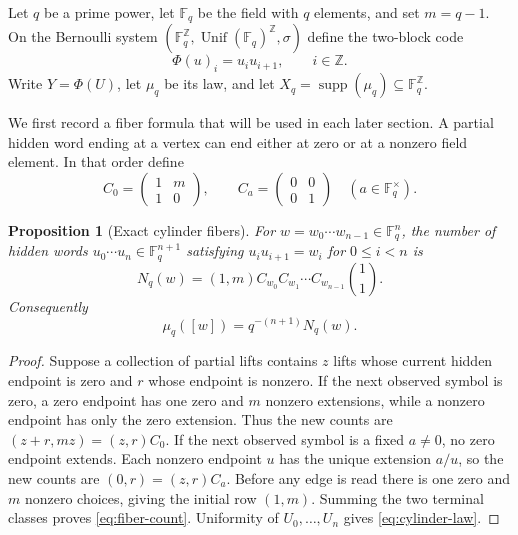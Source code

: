 \documentclass[11pt,a4paper]{amsart}
\newtheorem{proposition}[theorem]{Proposition}
\theoremstyle{definition}
\theoremstyle{remark}
\newcommand{\F}{\mathbb F}
\newcommand{\Z}{\mathbb Z}
\newcommand{\supp}{\operatorname{supp}}
\begin{document}
Let $q$ be a prime power, let $\F_q$ be the field with $q$ elements, and set
$m=q-1$.  On the Bernoulli system
$(\F_q^\Z,\operatorname{Unif}(\F_q)^\Z,\sigma)$ define the two-block code
\begin{equation}\label{eq:factor}
 \Phi(u)_i=u_i u_{i+1},\qquad i\in\Z.
\end{equation}
Write $Y=\Phi(U)$, let $\mu_q$ be its law, and let
$X_q=\supp(\mu_q)\subseteq\F_q^\Z$.

We first record a fiber formula that will be used in each later section.  A
partial hidden word ending at a vertex can end either at zero or at a
nonzero field element.  In that order define
\begin{equation}\label{eq:fiber-matrices}
 C_0=\begin{pmatrix}1&m\\[2pt]1&0\end{pmatrix},
 \qquad
 C_a=\begin{pmatrix}0&0\\[2pt]0&1\end{pmatrix}
 \quad(a\in\F_q^\times).
\end{equation}

\begin{proposition}[Exact cylinder fibers]\label{prop:fibers}
For $w=w_0\cdots w_{n-1}\in\F_q^n$, the number of hidden words
$u_0\cdots u_n\in\F_q^{n+1}$ satisfying
$u_i u_{i+1}=w_i$ for $0\leq i<n$ is
\begin{equation}\label{eq:fiber-count}
 N_q(w)=(1,m)C_{w_0}C_{w_1}\cdots C_{w_{n-1}}
 \binom11.
\end{equation}
Consequently
\begin{equation}\label{eq:cylinder-law}
 \mu_q([w])=q^{-(n+1)}N_q(w).
\end{equation}
\end{proposition}

\begin{proof}
Suppose a collection of partial lifts contains $z$ lifts whose current
hidden endpoint is zero and $r$ whose endpoint is nonzero.  If the next
observed symbol is zero, a zero endpoint has one zero and $m$ nonzero
extensions, while a nonzero endpoint has only the zero extension.  Thus the
new counts are $(z+r,mz)=(z,r)C_0$.  If the next observed symbol is a fixed
$a\ne0$, no zero endpoint extends.  Each nonzero endpoint $u$ has the unique
extension $a/u$, so the new counts are $(0,r)=(z,r)C_a$.  Before any edge is
read there is one zero and $m$ nonzero choices, giving the initial row
$(1,m)$.  Summing the two terminal classes proves \eqref{eq:fiber-count}.
Uniformity of $U_0,\ldots,U_n$ gives \eqref{eq:cylinder-law}.
\end{proof}
\end{document}

